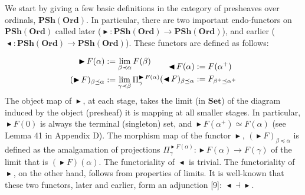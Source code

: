 \documentclass[10pt,a4paper]{article}
\begin{document}
We start by giving a few basic definitions in the category of presheaves over ordinals, $\mathbf{PSh}(\mathbf{Ord})$. In particular, there are two important endo-functors on $\mathbf{PSh}(\mathbf{Ord})$ called later ($\mathop{\blacktriangleright}:\mathbf{PSh}(\mathbf{Ord})\to\mathbf{PSh}(\mathbf{Ord})$), and earlier ($\mathop{\blacktriangleleft}:\mathbf{PSh}(\mathbf{Ord})\to\mathbf{PSh}(\mathbf{Ord})$). These functors are defined as follows:\par
    \[\begin{aligned} \mathop{\blacktriangleright}F(\alpha)&:=\lim_{\beta\prec\alpha}F(\beta)\\
(\mathop{\blacktriangleright}F)_{\beta\preceq\alpha}&:=\lim_{\gamma\prec\beta}\Pi^{\mathop{\blacktriangleright}F(\alpha)}_{\gamma}\\
\end{aligned}\hfill\begin{aligned} \mathop{\blacktriangleleft}F(\alpha)&:=F({\alpha}^{+})\\
(\mathop{\blacktriangleleft}F)_{\beta\preceq\alpha}&:=F_{{\beta}^{+}\preceq{\alpha}^{+}}\end{aligned}\hfill\]    
The object map of $\mathop{\blacktriangleright}$, at each stage, takes the limit (in $\mathbf{Set}$) of the diagram induced by the object (presheaf) it is mapping at all smaller stages. In particular, $\mathop{\blacktriangleright}F(0)$ is always the terminal (singleton) set, and $\mathop{\blacktriangleright}F({\alpha}^{+})\simeq F(\alpha)$ (see Lemma 41 in Appendix D). The morphism map of the functor $\mathop{\blacktriangleright}$, $(\mathop{\blacktriangleright}F)_{\beta\preceq\alpha}$ is defined as the amalgamation of projections $\Pi^{\mathop{\blacktriangleright}F(\alpha)}_{\gamma}:\mathop{\blacktriangleright}{}F(\alpha)\to F(\gamma)$ of the limit that is $(\mathop{\blacktriangleright}{}F)(\alpha)$. The functoriality of $\mathop{\blacktriangleleft}$ is trivial. The functoriality of $\mathop{\blacktriangleright}$, on the other hand, follows from properties of limits. It is well-known that these two functors, later and earlier, form an adjunction [9]: $\mathop{\blacktriangleleft}{}\dashv{}\mathop{\blacktriangleright}{}$.\par
 
 
 
\end{document}
